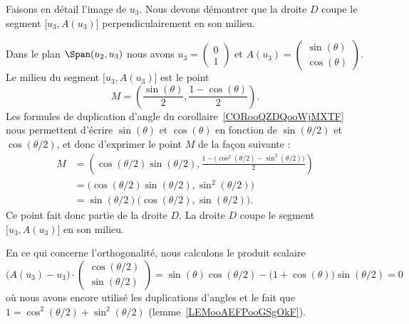 \begin{subproof}
    Faisons en détail l'image de \( u_3\). Nous devons démontrer que la droite \( D\) coupe le segment \( \mathopen[ u_3 , A(u_3) \mathclose]\) perpendiculairement en son milieu.

    Dans le plan \( \Span(u_2,u_3)\) nous avons \( u_3=\begin{pmatrix}
        0    \\
        1
    \end{pmatrix}\) et \( A(u_3)=\begin{pmatrix}
        \sin(\theta)    \\
        \cos(\theta)
    \end{pmatrix}\). Le milieu du segment \( \mathopen[ u_3 , A(u_3) \mathclose]\) est le point
    \begin{equation}
        M=\left( \frac{ \sin(\theta) }{2},\frac{ 1-\cos(\theta) }{2} \right).
    \end{equation}
    Les formules de duplication d'angle du corollaire~\ref{CORooQZDQooWjMXTF} nous permettent d'écrire \( \sin(\theta)\) et \( \cos(\theta)\) en fonction de \( \sin(\theta/2)\) et \( \cos(\theta/2)\), et donc d'exprimer le point \( M\) de la façon suivante :
    \begin{subequations}
        \begin{align}
            M&=\left( \cos(\theta/2)\sin(\theta/2),\frac{ 1-\big( \cos^2(\theta/2)-\sin^2(\theta/2) \big) }{2} \right)\\
            &=\big( \cos(\theta/2)\sin(\theta/2),\sin^2(\theta/2) \big)\\
            &=\sin(\theta/2)\big( \cos(\theta/2),\sin(\theta/2) \big).
        \end{align}
    \end{subequations}
    Ce point fait donc partie de la droite \( D\). La droite \( D\) coupe le segment \( \mathopen[ u_3 , A(u_3) \mathclose]\) en son milieu.

    En ce qui concerne l'orthogonalité, nous calculons le produit scalaire
    \begin{equation}
            \big( A(u_3)-u_3 \big)\cdot\begin{pmatrix}
                \cos(\theta/2)    \\
                \sin(\theta/2)
            \end{pmatrix}
            =\sin(\theta)\cos(\theta/2)-\big( 1+\cos(\theta) \big)\sin(\theta/2)=0
    \end{equation}
    où nous avons encore utilisé les duplications d'angles et le fait que \( 1=\cos^2(\theta/2)+\sin^2(\theta/2)\) (lemme~\ref{LEMooAEFPooGSgOkF}).


\end{subproof}
